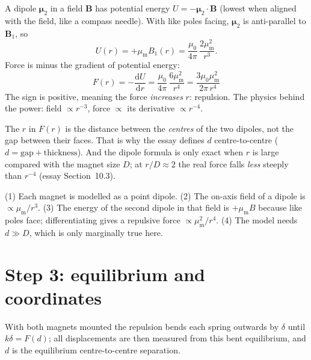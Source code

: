 \documentclass[11pt,a4paper]{article}
\newcommand{\muz}{\mu_0}
\newcommand{\mum}{\mu_{\mathrm m}}
\newcommand{\dd}{\mathrm{d}}
\begin{document}
A dipole $\bm\mu_2$ in a field $\bm B$ has potential energy $U=-\bm\mu_2\cdot\bm B$ (lowest when aligned with the field, like a compass needle). With like poles facing, $\bm\mu_2$ is anti-parallel to $\bm B_1$, so
\begin{equation}
U(r)=+\mum B_1(r)=\frac{\muz}{4\pi}\,\frac{2\mum^2}{r^3}.
\end{equation}
Force is minus the gradient of potential energy:
\begin{equation}
\boxed{F(r)=-\frac{\dd U}{\dd r}=\frac{\muz}{4\pi}\,\frac{6\mum^2}{r^4}=\frac{3\muz\mum^2}{2\pi\,r^4}}
\end{equation}
The sign is positive, meaning the force \emph{increases} $r$: repulsion. The physics behind the power: field $\propto r^{-3}$, force $\propto$ its derivative $\propto r^{-4}$.

\begin{pitfall}
The $r$ in $F(r)$ is the distance between the \emph{centres} of the two dipoles, not the gap between their faces. That is why the essay defines $d$ centre-to-centre ($d=\text{gap}+\text{thickness}$). And the dipole formula is only exact when $r$ is large compared with the magnet size $D$; at $r/D\approx2$ the real force falls \emph{less} steeply than $r^{-4}$ (essay Section~10.3).
\end{pitfall}

\begin{ownwords}
(1) Each magnet is modelled as a point dipole. (2) The on-axis field of a dipole is $\propto\mum/r^3$. (3) The energy of the second dipole in that field is $+\mum B$ because like poles face; differentiating gives a repulsive force $\propto\mum^2/r^4$. (4) The model needs $d\gg D$, which is only marginally true here.
\end{ownwords}

\bigskip
\section{Step 3: equilibrium and coordinates}

\begin{idea}
With both magnets mounted the repulsion bends each spring outwards by $\delta$ until $k\delta=F(d)$; all displacements are then measured from this bent equilibrium, and $d$ is the equilibrium centre-to-centre separation.
\end{idea}
\end{document}
